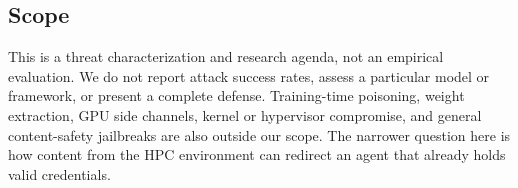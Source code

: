 \subsection{Scope}
\label{sec:scope}

This is a threat characterization and research agenda, not an empirical evaluation. We do not report attack success rates, assess a particular model or framework, or present a complete defense. Training-time poisoning, weight extraction, GPU side channels, kernel or hypervisor compromise, and general content-safety jailbreaks are also outside our scope. The narrower question here is how content from the HPC environment can redirect an agent that already holds valid credentials.
